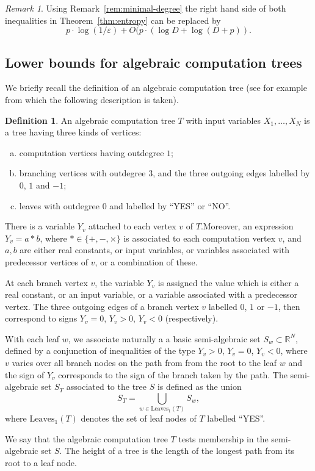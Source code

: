 \documentclass[10pt]{amsart}
\theoremstyle{definition}
\newtheorem{definition}{Definition}[section]
\theoremstyle{remark}
\newtheorem{remark}{Remark}
\numberwithin{equation}{section}
\newcommand {\eps} {{\varepsilon}}
\begin{document}
\begin{remark}
    \label{rem:entropy2}
    Using Remark~\ref{rem:minimal-degree} the right hand side of both inequalities in Theorem~\ref{thm:entropy} can be replaced by 
    \[
    p \cdot \log(1/\eps) + O(p \cdot  (\log D + \log (D + p)).
    \]
\end{remark}





\subsection{Lower bounds for algebraic computation trees}
\label{subsec:tree}
We briefly recall the definition of an algebraic computation tree (see for example \cite{GV2017} from which the following description is taken).
\begin{definition}
\label{def:tree}
An algebraic computation tree $T$ with input variables 
$X_1,\ldots,X_N$ is a tree having three kinds of vertices: 
\begin{enumerate}[(a)]
    \item computation vertices having outdegree $1$;
     \item branching vertices with  outdegree $3$, and the three outgoing edges labelled by $0$, $1$ and $-1$;
     \item leaves with outdegree $0$ and labelled by ``YES'' or ``NO''.
\end{enumerate}
There is a variable $Y_v$ attached to each vertex
$v$ of $T$.Moreover, an expression 
$Y_v = a * b$, where
$* \in \{+,-,\times\}$ is associated to each computation vertex $v$,
and $a,b$ are either real constants, or input variables, or variables
associated with predecessor vertices of $v$, or a combination of these.

At each branch vertex $v$, the variable $Y_v$ is assigned the value which is either a real
constant, or an input variable, or a variable associated with a predecessor vertex. The
three outgoing edges of a branch vertex $v$ labelled $0$, $1$ or $-1$, then correspond to signs 
$Y_v = 0$, $Y_v > 0$, $Y_v <0$ (respectively).

With each leaf $w$, 
we associate naturally a
a basic semi-algebraic set $S_w \subset \mathbb{R}^N$, defined
by a conjunction of inequalities of the type
$Y_v > 0$, $Y_v = 0$, $Y_v <0$,
where $v$ varies over all branch nodes on the path from from the root to the leaf $w$ and the sign of $Y_v$ corresponds to the sign of the branch
taken by the path. 
The semi-algebraic set $S_T$ associated to the tree $S$ is defined as the union
\[
S_T = \bigcup_{w \in \mathrm{Leaves}_1(T)} S_w,
\]
where $\mathrm{Leaves}_1(T)$ denotes the set of leaf nodes of $T$ 
labelled ``YES''.

We say that the algebraic computation tree $T$ tests membership in the semi-algebraic set $S$. The height of a tree is the length of the longest path from its root to a leaf node.
\end{definition}
\end{document}

